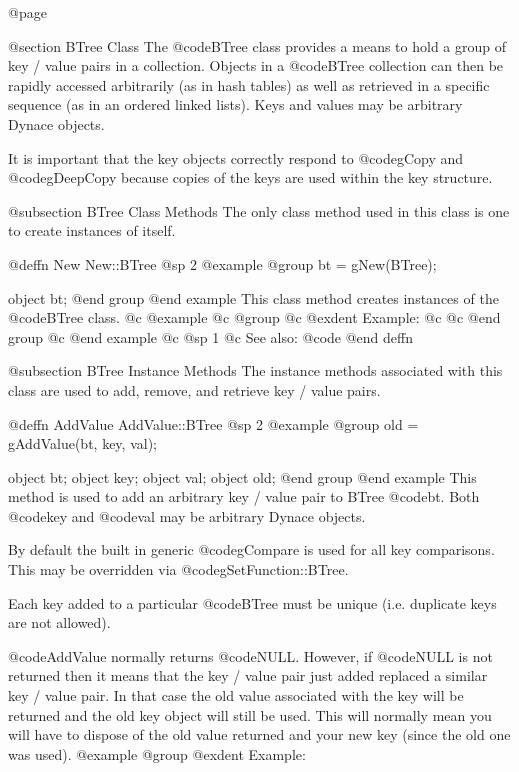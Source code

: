 @page

@section BTree Class
The @code{BTree} class provides a means to hold a group of key / value
pairs in a collection.  Objects in a @code{BTree} collection can then be
rapidly accessed arbitrarily (as in hash tables) as well as retrieved in
a specific sequence (as in an ordered linked lists).  Keys and values
may be arbitrary Dynace objects.

It is important that the key objects correctly respond to @code{gCopy}
and @code{gDeepCopy} because copies of the keys are used within the key
structure.

@subsection BTree Class Methods
The only class method used in this class is one to create instances of itself.



@deffn {New} New::BTree
@sp 2
@example
@group
bt = gNew(BTree);

object  bt;
@end group
@end example
This class method creates instances of the @code{BTree} class. 
@c @example
@c @group
@c @exdent Example:
@c 
@c @end group
@c @end example
@c @sp 1
@c See also:  @code{}
@end deffn



@subsection BTree Instance Methods
The instance methods associated with this class are used to add, remove,
and retrieve key / value pairs.





@deffn {AddValue} AddValue::BTree
@sp 2
@example
@group
old = gAddValue(bt, key, val);

object  bt;
object  key;
object  val;
object  old;
@end group
@end example
This method is used to add an arbitrary key / value pair to BTree
@code{bt}.  Both @code{key} and @code{val} may be arbitrary Dynace
objects.

By default the built in generic @code{gCompare} is used for all key comparisons.
This may be overridden via @code{gSetFunction::BTree}.

Each key added to a particular @code{BTree} must be unique
(i.e. duplicate keys are not allowed).

@code{AddValue} normally returns @code{NULL}.  However, if @code{NULL}
is not returned then it means that the key / value pair just added
replaced a similar key / value pair.  In that case the old value
associated with the key will be returned and the old key object will
still be used.  This will normally mean you will have to dispose of
the old value returned and your new key (since the old one was used).
@example
@group
@exdent Example:

